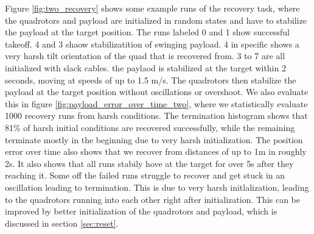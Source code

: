 Figure \ref{fig:two_recovery} shows some example runs of the recovery task, where the quadrotors and payload are initialized in random states and have to stabilize the payload at the target position. The runs labeled 0 and 1 show successful takeoff. 4 and 3 shaow stabilizatition of swinging payload. 4 in specific shows a very harsh tilt orientation of the quad that is recovered from. 3 to 7 are all initialized with slack cables. the paylaod is stabilized at the target within 2 seconds, moving at speeds of up to 1.5 m/s. The quadrotors then stabilize the payload at the target position without oscillations or overshoot.
We also evaluate this in figure \ref{fig:payload_error_over_time_two}, where we statistically evaluate 1000 recovery runs from harsh conditions. The termination histogram shows that 81\% of harsh initial conditions are recovered successfully, while the remaining terminate mostly in the beginning due to very harsh initialization. The position error over time also shows that we recover from distances of up to 1m in roughly 2s. It also shows that all runs stabily hove at the target for over 5s after they reaching it. Some off the failed runs struggle to recover and get stuck in an oscillation leading to termination. This is due to very harsh initlalization, leading to the quadrotors running into each other right after initialization. This can be improved by better initialization of the quadrotors and payload, which is discussed in section \ref{sec:reset}.

